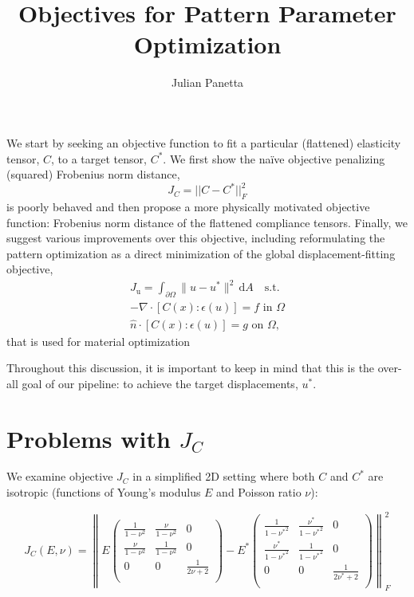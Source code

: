 \documentclass[10pt]{article}
\title{Objectives for Pattern Parameter Optimization}
\author{Julian Panetta}
\providecommand{\norm}[1]{\lVert#1\rVert}
\providecommand{\dA}{\, \mathrm{d}A}
\begin{document}
\maketitle

We start by seeking an objective function to fit a
particular (flattened) elasticity tensor, $C$, to a target tensor, $C^*$.
We first show the na\"ive objective penalizing (squared) Frobenius norm
distance, $$J_C = ||C - C^*||^2_F$$ is poorly behaved and then propose a more
physically motivated objective function: Frobenius norm distance of the
flattened compliance tensors. Finally, we suggest various improvements over this objective,
including reformulating the pattern optimization as a direct minimization of
the global displacement-fitting objective,
\begin{equation}
\begin{aligned}
\label{eqn:main_objective}
J_\text{u} = \int_{\partial \Omega} \norm{u - u^*}^2 \dA \quad \text{s.t.} \\
-\nabla \cdot [C(x) : \epsilon(u)] = f \text{ in } \Omega \\
\hat{n} \cdot [C(x) : \epsilon(u)] = g \text{ on } \Omega,
\end{aligned}
\end{equation}
that is used for material optimization

Throughout this discussion, it is important to keep in mind that this is the
over-all goal of our pipeline: to achieve the target displacements, $u^*$.

\section{Problems with $J_C$}
We examine objective $J_C$ in a simplified 2D setting where both $C$ and
$C^*$ are isotropic (functions of Young's modulus $E$ and Poisson ratio $\nu$):

$$
J_C(E, \nu) =
    \left\lVert
    E
    \left(
    \begin{array}{ccc}
     \frac{1}{1-\nu ^2} & \frac{\nu }{1-\nu ^2} & 0 \\
     \frac{\nu }{1-\nu ^2} & \frac{1}{1-\nu ^2} & 0 \\
     0 & 0 & \frac{1}{2 \nu +2} \\
    \end{array}
    \right) -
    E^*
    \left(
    \begin{array}{ccc}
     \frac{1}{1-{\nu^*} ^2} & \frac{{\nu^*} }{1-{\nu^*} ^2} & 0 \\
     \frac{{\nu^*} }{1-{\nu^*} ^2} & \frac{1}{1-{\nu^*} ^2} & 0 \\
     0 & 0 & \frac{1}{2 {\nu^*} +2} \\
    \end{array}
    \right)
    \right\rVert^2_F
$$
\end{document}
